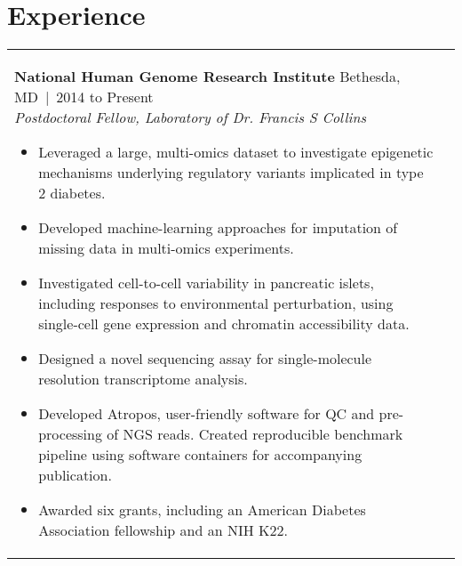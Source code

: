 \documentclass[11pt,letter,sans]{moderncv}
\makeatletter
\newenvironment{entrylistFive}{%
  \begin{longtable}{@{\extracolsep{\fill}}ll}
}{%
  \end{longtable}
}
\newcommand{\entryFive}[5]{%
  \parbox[t]{170mm}{%
    \textbf{#2}%
    \hfill%
    {\footnotesize #3~|~#1}\\%
	\emph{#4}\\%
    #5\vspace{\parsep}%
  }\\}
\makeatother
\begin{document}
\section{Experience}
\begin{entrylistFive}
\entryFive
{2014 to Present}
{National Human Genome Research Institute}
{Bethesda, MD}
{Postdoctoral Fellow, Laboratory of Dr. Francis S Collins}
{\vspace{-5mm}
\begin{itemize}
\item {Leveraged a large, multi-omics dataset to investigate epigenetic mechanisms underlying regulatory variants implicated in type 2 diabetes.}
\item {Developed machine-learning approaches for imputation of missing data in multi-omics experiments.}
\item {Investigated cell-to-cell variability in pancreatic islets, including responses to environmental perturbation, using single-cell gene expression and chromatin accessibility data.}
\item {Designed a novel sequencing assay for single-molecule resolution transcriptome analysis.}
\item {Developed Atropos, user-friendly software for QC and pre-processing of NGS reads. Created reproducible benchmark pipeline using software containers for accompanying publication.}
\item {Awarded six grants, including an American Diabetes Association fellowship and an NIH K22.}
\end{itemize}
}

\entryFive
{2016 to Present}
{American Academy of Bioinformatics}
{Bethesda, MD}
{Instructor of Bioinformatics}
{\vspace{-5mm}
\begin{itemize}
\item {Developed comprehensive, open-source course materials for workshops in DNA-Seq and RNA-Seq data analysis.}
\item {Taught workshops and earned highly positive student reviews.}
\end{itemize}
}


\end{entrylistFive}
\end{document}
